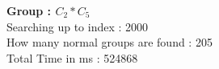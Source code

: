 \textbf{Group : $C_2*C_5$}\\
Searching up to index : 2000\\
How many normal groups are found : 205\\
Total Time in ms : 524868\\
